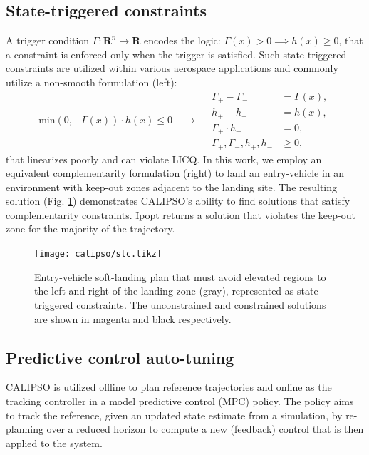 \subsection{State-triggered constraints}
A trigger condition $\Gamma:\mathbf{R}^{n} \rightarrow \mathbf{R}$ encodes the logic: $\Gamma(x) > 0 \implies h(x) \geq 0$, that a constraint is enforced only when the trigger is satisfied. Such state-triggered constraints are utilized within various aerospace applications \cite{szmuk2019real,szmuk2020successive} and commonly utilize a non-smooth formulation (left):
\begin{equation}
\mbox{min}(0, -\Gamma(x)) \cdot h(x) \leq 0
\quad
\rightarrow 
\quad
\begin{aligned}
	\Gamma_+ - \Gamma_- &= \Gamma(x),\\ 
	h_+ - h_- &= h(x), \\
	\Gamma_+ \cdot h_- &= 0, \\
	\Gamma_+, \Gamma_-, h_+, h_- & \geq 0, 
\end{aligned}
\end{equation}
that linearizes poorly and can violate LICQ. In this work, we employ an equivalent complementarity formulation (right) to land an entry-vehicle in an environment with keep-out zones adjacent to the landing site. The resulting solution (Fig. \ref{calipso_stc}) demonstrates CALIPSO's ability to find solutions that satisfy complementarity constraints. Ipopt returns a solution that violates the keep-out zone for the majority of the trajectory. 

\begin{figure}[H]
	\centering
	\texttt{[image: calipso/stc.tikz]}
	\caption[State-triggered-constraint plan for entry-vehicle soft-landing with keep-out zones]{Entry-vehicle soft-landing plan that must avoid elevated regions to the left and right of the landing zone (gray), represented as state-triggered constraints. The unconstrained and constrained solutions are shown in magenta and black respectively.}
	\label{calipso_stc}
\end{figure}

\subsection{Predictive control auto-tuning}

CALIPSO is utilized offline to plan reference trajectories and online as the tracking controller in a model predictive control (MPC) policy. The policy aims to track the reference, given an updated state estimate from a simulation, by re-planning over a reduced horizon to compute a new (feedback) control that is then applied to the system.

